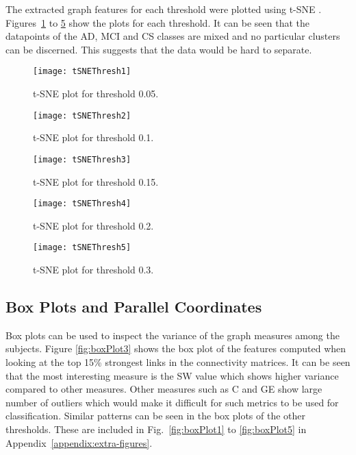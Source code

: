 		The extracted graph features for each threshold were plotted using \ac{t-SNE} \autocite{Maaten2008}. Figures~\ref{fig:tsneT1} to \ref{fig:tsneT5} show the plots for each threshold. It can be seen that the datapoints of the \ac{AD}, \ac{MCI} and \ac{CS} classes are mixed and no particular clusters can be discerned. This suggests that the data would be hard to separate.

		\begin{figure}
			\centering
		    \texttt{[image: tSNEThresh1]}
		    \caption{t-SNE plot for threshold 0.05.}
		    \label{fig:tsneT1}
		\end{figure}
		\begin{figure}
			\centering
		    \texttt{[image: tSNEThresh2]}
		    \caption{t-SNE plot for threshold 0.1.}
		    \label{fig:tsneT2}
		\end{figure}
		\begin{figure}
			\centering
		    \texttt{[image: tSNEThresh3]}
		    \caption{t-SNE plot for threshold 0.15.}
		    \label{fig:tsneT3}
		\end{figure}
		\begin{figure}
			\centering
		    \texttt{[image: tSNEThresh4]}
		    \caption{t-SNE plot for threshold 0.2.}
		    \label{fig:tsneT4}
		\end{figure}
		\begin{figure}
			\centering
		    \texttt{[image: tSNEThresh5]}
		    \caption{t-SNE plot for threshold 0.3.}
		    \label{fig:tsneT5}
		\end{figure}

		\subsection{Box Plots and Parallel Coordinates}
		Box plots can be used to inspect the variance of the graph measures among the subjects. Figure \ref{fig:boxPlot3} shows the box plot of the features computed when looking at the top 15\% strongest links in the connectivity matrices. It can be seen that the most interesting measure is the \ac{SW} value which shows higher variance compared to other measures. Other measures such as \ac{C} and \ac{GE} show large number of outliers which would make it difficult for such metrics to be used for classification. Similar patterns can be seen in the box plots of the other thresholds. These are included in Fig.~\ref{fig:boxPlot1} to \ref{fig:boxPlot5} in Appendix~\ref{appendix:extra-figures}.  

